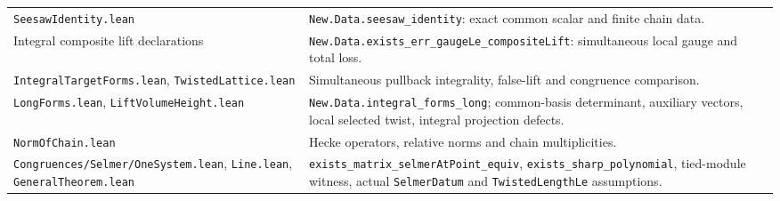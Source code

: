 \documentclass[11pt,a4paper]{article}
\begin{document}
\begin{longtable}{p{}p{}}
\texttt{SeesawIdentity.lean}&\texttt{New.Data.seesaw\_\allowbreak identity}: exact common scalar and finite chain data.\\
Integral composite lift declarations&\texttt{New.Data.exists\_\allowbreak err\_\allowbreak gaugeLe\_\allowbreak compositeLift}: simultaneous local gauge and total loss.\\
\texttt{IntegralTargetForms.lean}, \texttt{TwistedLattice.lean}&Simultaneous pullback integrality, false-lift and congruence comparison.\\
\texttt{LongForms.lean}, \texttt{LiftVolumeHeight.lean}&\texttt{New.Data.integral\_\allowbreak forms\_\allowbreak long}; common-basis determinant, auxiliary vectors, local selected twist, integral projection defects.\\
\texttt{NormOfChain.lean}&Hecke operators, relative norms and chain multiplicities.\\
\texttt{Congruences/\allowbreak Selmer/\allowbreak  OneSystem.lean}, \texttt{Line.lean}, \texttt{GeneralTheorem.lean}&\texttt{exists\_\allowbreak matrix\_\allowbreak selmerAtPoint\_\allowbreak equiv}, \texttt{exists\_\allowbreak sharp\_\allowbreak polynomial}, tied-module witness, actual \texttt{SelmerDatum} and \texttt{TwistedLengthLe} assumptions.\\\bottomrule
\end{longtable}
\end{document}
